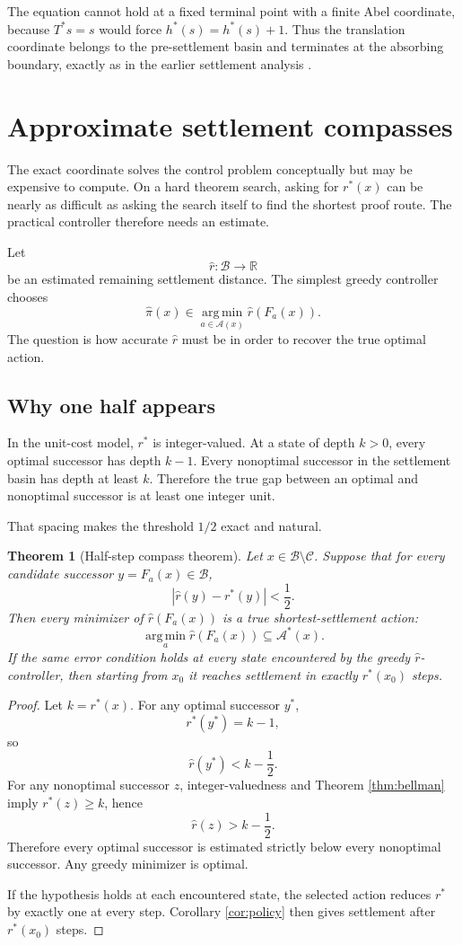 \documentclass[11pt,letterpaper]{article}
\newtheorem{theorem}{Theorem}[section]
\theoremstyle{remark}
\newcommand{\Cset}{\mathcal C}
\newcommand{\Basin}{\mathcal B}
\newcommand{\A}{\mathcal A}
\newcommand{\R}{\mathbb R}
\newcommand{\rstar}{r^{\!*}}
\newcommand{\rhat}{\widehat r}
\newcommand{\argmin}{\operatorname*{arg\,min}}
\begin{document}
The equation cannot hold at a fixed terminal point with a finite Abel coordinate, because $T^*s=s$ would force $h^*(s)=h^*(s)+1$. Thus the translation coordinate belongs to the pre-settlement basin and terminates at the absorbing boundary, exactly as in the earlier settlement analysis \cite{VSS}.

\section{Approximate settlement compasses}\label{sec:approx}

The exact coordinate solves the control problem conceptually but may be expensive to compute. On a hard theorem search, asking for $\rstar(x)$ can be nearly as difficult as asking the search itself to find the shortest proof route. The practical controller therefore needs an estimate.

Let
\[
\rhat:\Basin\to\R
\]
be an estimated remaining settlement distance. The simplest greedy controller chooses
\[
\widehat\pi(x)\in\argmin_{a\in\A(x)}\rhat(F_a(x)).
\]
The question is how accurate $\rhat$ must be in order to recover the true optimal action.

\subsection{Why one half appears}

In the unit-cost model, $\rstar$ is integer-valued. At a state of depth $k>0$, every optimal successor has depth $k-1$. Every nonoptimal successor in the settlement basin has depth at least $k$. Therefore the true gap between an optimal and nonoptimal successor is at least one integer unit.

That spacing makes the threshold $1/2$ exact and natural.

\begin{theorem}[Half-step compass theorem]\label{thm:halfstep}
Let $x\in\Basin\setminus\Cset$. Suppose that for every candidate successor $y=F_a(x)\in\Basin$,
\[
|\rhat(y)-\rstar(y)|<\frac12.
\]
Then every minimizer of $\rhat(F_a(x))$ is a true shortest-settlement action:
\[
\argmin_a \rhat(F_a(x))\subseteq \A^*(x).
\]
If the same error condition holds at every state encountered by the greedy $\rhat$-controller, then starting from $x_0$ it reaches settlement in exactly $\rstar(x_0)$ steps.
\end{theorem}

\begin{proof}
Let $k=\rstar(x)$. For any optimal successor $y^*$,
\[
\rstar(y^*)=k-1,
\]
so
\[
\rhat(y^*)<k-\frac12.
\]
For any nonoptimal successor $z$, integer-valuedness and Theorem \ref{thm:bellman} imply $\rstar(z)\ge k$, hence
\[
\rhat(z)>k-\frac12.
\]
Therefore every optimal successor is estimated strictly below every nonoptimal successor. Any greedy minimizer is optimal.

If the hypothesis holds at each encountered state, the selected action reduces $\rstar$ by exactly one at every step. Corollary \ref{cor:policy} then gives settlement after $\rstar(x_0)$ steps.
\end{proof}
\end{document}
